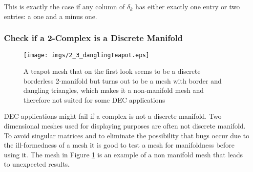 This is exactly the case if any column of $\delta_k$ has either exactly one entry or two entries: a one and a minus one. 


\subsubsection{Check if a 2-Complex is a Discrete Manifold}
\begin{figure}[tb]
	\begin{center}
	\texttt{[image: imgs/2\_3\_danglingTeapot.eps]}
	\end{center}
	\caption{A teapot mesh that on the first look seems to be a discrete borderless 2-manifold but turns out to be a mesh with border and dangling triangles, which makes it a non-manifold mesh and therefore not suited for some DEC applications}
	\label{fig:2_badteapot}
\end{figure}

DEC applications might fail if a complex is not a discrete manifold. Two dimensional meshes used for displaying purposes are often not discrete manifold. To avoid singular matrices and to eliminate the possibility that bugs occur due to the ill-formedness of a mesh it is good to test a mesh for manifoldness before using it. The mesh in Figure \ref{fig:2_badteapot} is an example of a non manifold mesh that leads to unexpected results.



